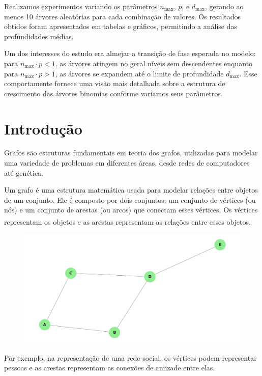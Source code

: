 \documentclass[12pt, a4paper]{scrreprt}
\begin{document}
Realizamos experimentos variando os parâmetros \( n_{\text{max}} \), \( p \), e \( d_{\text{max}} \), gerando ao menos 10 árvores aleatórias para cada combinação de valores. Os resultados obtidos foram apresentados em tabelas e gráficos, permitindo a análise das profundidades médias.

Um dos interesses do estudo era almejar a transição de fase esperada no modelo: para \( n_{\text{max}} \cdot p < 1 \), as árvores atingem no geral níveis sem descendentes enquanto para \( n_{\text{max}} \cdot p > 1 \), as árvores se expandem até o limite de profundidade \( d_{\text{max}} \). Esse comportamente fornece uma visão mais detalhada sobre a estrutura de crescimento das árvores binomias conforme variamos seus parâmetros.

\chapter{Introdução}

Grafos são estruturas fundamentais em teoria dos grafos, utilizadas para modelar uma variedade de problemas em diferentes áreas, desde redes de computadores até genética.

Um grafo é uma estrutura matemática usada para modelar relações entre objetos de um conjunto. Ele é composto por dois conjuntos: um conjunto de vértices (ou nós) e um conjunto de arestas (ou arcos) que conectam esses vértices. Os vértices representam os objetos e as arestas representam as relações entre esses objetos. \textsuperscript{\cite{emilio2024grafos}}

\begin{figure}[h]
    \centering
    \includegraphics[width=.75\textwidth]{src/exemplo_simples_grafo.png}
    \label{fig:exemplo de grafo simples}
\end{figure}

Por exemplo, na representação de uma rede social, os vértices podem representar pessoas e as arestas representam as conexões de amizade entre elas.
\end{document}
